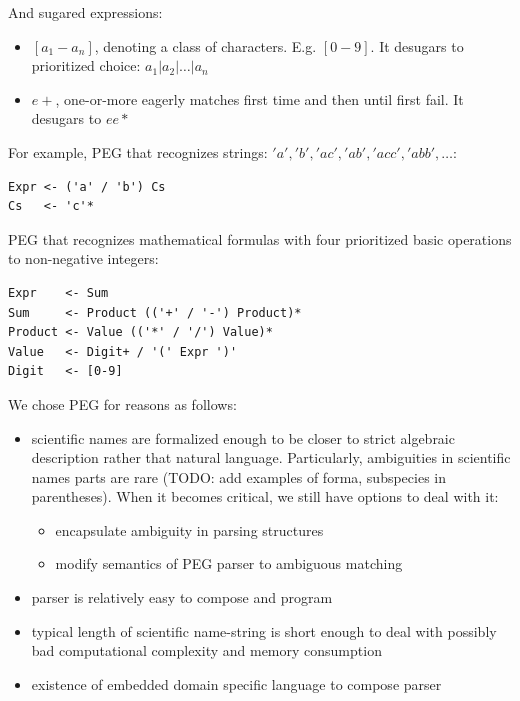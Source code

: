 \documentclass{bmcart}
\begin{document}
And sugared expressions:

\begin{itemize}
    \item $[a_1-a_n]$, denoting a class of characters. E.g.
    $[0-9]$. It desugars to prioritized choice: $a_1 \vert a_2 \vert \ldots
    \vert a_n$
    \item $e+$, one-or-more eagerly matches first time and then until first
    fail. It desugars to $e e*$
\end{itemize}

For example, PEG that recognizes strings: $'a', 'b', 'ac', 'ab', 'acc', 'abb',
\ldots$:

\begin{lstlisting}[frame=single]
Expr <- ('a' / 'b') Cs
Cs   <- 'c'*
\end{lstlisting}

PEG that recognizes mathematical formulas with four prioritized basic
operations to non-negative integers:

\begin{lstlisting}[frame=single]
Expr    <- Sum
Sum     <- Product (('+' / '-') Product)*
Product <- Value (('*' / '/') Value)*
Value   <- Digit+ / '(' Expr ')'
Digit   <- [0-9]
\end{lstlisting}

We chose PEG for reasons as follows:

\begin{itemize}
  \item scientific names are formalized enough to be closer to strict
  algebraic description rather that natural language. Particularly,
  ambiguities in scientific names parts are rare (TODO:  add examples of forma,
  subspecies in parentheses). When it becomes critical, we still have
  options to deal with it:
    \begin{itemize}
      \item encapsulate ambiguity in parsing structures
      \item modify semantics of PEG parser to ambiguous matching
    \end{itemize}
  \item parser is relatively easy to compose and program
  \item typical length of scientific name-string is short enough to deal with
  possibly bad computational complexity and memory consumption
  \item existence of embedded domain specific language to compose parser
\end{itemize}
\end{document}
